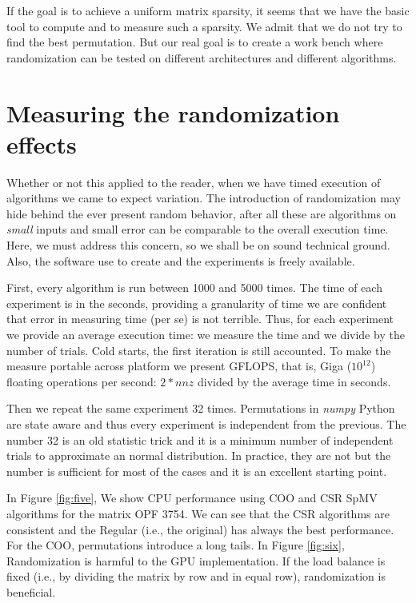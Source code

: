 \documentclass[manuscript,screen]{acmart}
\begin{document}

If the goal is to achieve a uniform matrix sparsity, it seems that we
have the basic tool to compute and to measure such a sparsity. We
admit that we do not try to find the best permutation. But our real
goal is to create a work bench where randomization can be tested on
different architectures and different algorithms.

\section{Measuring the randomization effects}
\label{sec:measuring}

Whether or not this applied to the reader, when we have timed
execution of algorithms we came to expect variation.  The introduction
of randomization may hide behind the ever present random behavior,
after all these are algorithms on {\em small} inputs and small error
can be comparable to the overall execution time. Here, we must address
this concern, so we shall be on sound technical ground. Also, the
software use to create and the experiments is freely available. 

First, every algorithm is run between 1000 and 5000 times. The time of
each experiment is in the seconds, providing a granularity of time we
are confident that error in measuring time (per se) is not
terrible. Thus, for each experiment we provide an average execution
time: we measure the time and we divide by the number of trials. Cold
starts, the first iteration is still accounted. To make the measure
portable across platform we present GFLOPS, that is, Giga ($10^12$)
floating operations per second: $2*nnz$ divided by the average time in
seconds.

Then we repeat the same experiment 32 times. Permutations in {\em
  numpy} Python are state aware and thus every experiment is
independent from the previous. The number 32 is an old statistic trick
and it is a minimum number of independent trials to approximate an
normal distribution. In practice, they are not but the number is
sufficient for most of the cases and it is an excellent starting
point.

In Figure \ref{fig:five}, We show CPU performance using COO and CSR
SpMV algorithms for the matrix OPF 3754. We can see that the CSR
algorithms are consistent and the Regular (i.e., the original) has
always the best performance. For the COO, permutations introduce a
long tails. In Figure \ref{fig:six}, Randomization is harmful to the
GPU implementation. If the load balance is fixed (i.e., by dividing
the matrix by row and in equal row), randomization is beneficial.
\end{document}
